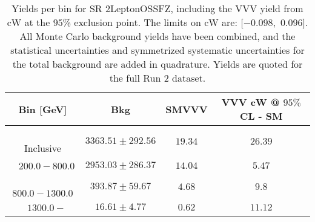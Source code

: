 \begin{table}[!htbp]
    \small
    \center
    \begin{tabular}{c||c|c|c}
    Bin [GeV] & Bkg & SMVVV & \pbox{20cm}{VVV \\ cW @ $95\%$ CL - SM \\ }\\
    \hline
    \pbox{20cm}{ ~ \\Inclusive\\ } & $3363.51 \pm 292.56$ & $19.34$ & $26.39$\\
    \hline
    \pbox{20cm}{ ~ \\$200.0-800.0$\\ } & $2953.03 \pm 286.37$ & $14.04$ & $5.47$\\
    \hline
    \pbox{20cm}{ ~ \\$800.0-1300.0$\\ } & $393.87 \pm 59.67$ & $4.68$ & $9.8$\\
    \hline
    \pbox{20cm}{ ~ \\$1300.0-$\\ } & $16.61 \pm 4.77$ & $0.62$ & $11.12$\\
\end{tabular}
    \caption{Yields per bin for SR 2LeptonOSSFZ, including the VVV yield from cW at the $95$\% exclusion point. The limits on cW are: [$-0.098$,~$0.096$]. All Monte Carlo background yields have been combined, and the statistical uncertainties and symmetrized systematic uncertainties for the total background are added in quadrature. Yields are quoted for the full Run 2 dataset.}
    \label{tab:2LeptonOSSFZ$binssignal}
\end{table}
